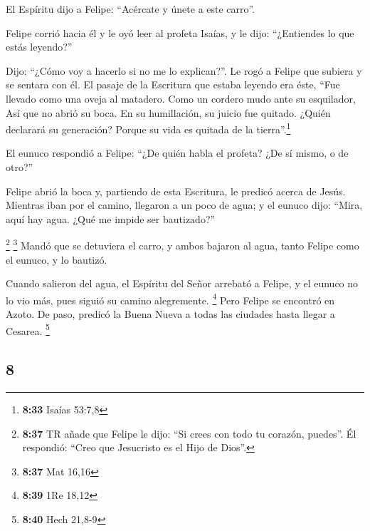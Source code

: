 \begin{paracol}{2}
 El Espíritu dijo a Felipe: ``Acércate y únete a este
carro''.

 Felipe corrió hacia él y le oyó leer al profeta Isaías,
y le dijo: ``¿Entiendes lo que estás leyendo?''

 Dijo: ``¿Cómo voy a hacerlo si no me lo explican?''. Le
rogó a Felipe que subiera y se sentara con él.  El pasaje
de la Escritura que estaba leyendo era éste, ``Fue llevado como una
oveja al matadero. Como un cordero mudo ante su esquilador, Así que no
abrió su boca.  En su humillación, su juicio fue quitado.
¿Quién declarará su generación? Porque su vida es quitada de la
tierra''.\footnote{\textbf{8:33} Isaías 53:7,8}

 El eunuco respondió a Felipe: ``¿De quién habla el
profeta? ¿De sí mismo, o de otro?''

 Felipe abrió la boca y, partiendo de esta Escritura, le
predicó acerca de Jesús.  Mientras iban por el camino,
llegaron a un poco de agua; y el eunuco dijo: ``Mira, aquí hay agua.
¿Qué me impide ser bautizado?''

 \footnote{\textbf{8:37} TR añade que Felipe le dijo:
  ``Si crees con todo tu corazón, puedes''. Él respondió: ``Creo que
  Jesucristo es el Hijo de Dios''.} \footnote{\textbf{8:37} Mat 16,16}
 Mandó que se detuviera el carro, y ambos bajaron al
agua, tanto Felipe como el eunuco, y lo bautizó.

 Cuando salieron del agua, el Espíritu del Señor arrebató
a Felipe, y el eunuco no lo vio más, pues siguió su camino alegremente.
\footnote{\textbf{8:39} 1Re 18,12}  Pero Felipe se
encontró en Azoto. De paso, predicó la Buena Nueva a todas las ciudades
hasta llegar a Cesarea. \footnote{\textbf{8:40} Hech 21,8-9}

\switchcolumn
\begin{otherlanguage}{english}

\hypertarget{section-15}{%
\section{8}\label{section-15}}


\end{otherlanguage}
\end{paracol}
